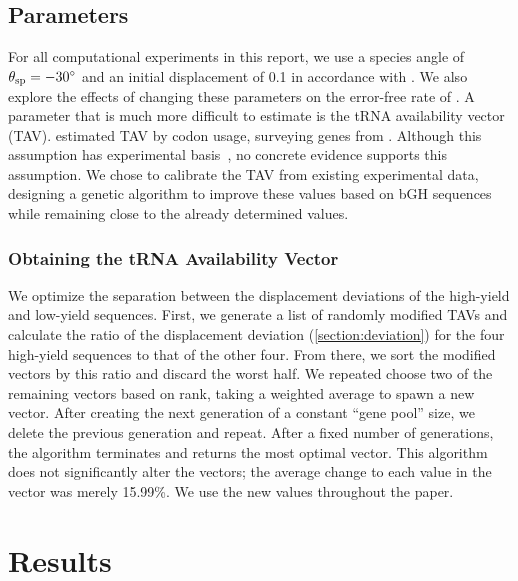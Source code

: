 \documentclass[twocolumn, article, oneside]{memoir}
\begin{document}
\subsection{Parameters}
\label{section:parameters}
For all computational experiments in this report, we use a species
angle of $\theta_{\textrm{sp}} = -30^\circ$ and an initial displacement of 0.1
in accordance with \citet{lalit:mechanics}.
We also explore the effects of changing these parameters on the
error-free rate of \prfB.
A parameter that is much more difficult to estimate
is the tRNA availability vector (TAV).
\citeauthor{lalit:mechanics} estimated TAV by codon usage,
surveying genes from \ecoli.
Although this assumption has experimental basis~\cite{ikemura},
no concrete evidence supports this assumption.
We chose to calibrate the TAV from existing experimental data,
designing a genetic algorithm to improve these values based on
bGH sequences while remaining close
to the already determined values.

\subsubsection{Obtaining the tRNA Availability Vector}
We optimize the separation between the displacement deviations of the
high-yield and low-yield sequences. First, we generate a list of
randomly modified TAVs and calculate the ratio of the
displacement deviation (\autoref{section:deviation}) for the four
high-yield sequences to that of the other four. From there, we sort the
modified vectors by this ratio and discard the worst half.
We repeated choose two of the remaining vectors based on rank, taking a weighted
average to spawn a new vector.  After creating the
next generation of a constant ``gene pool'' size, we delete
the previous generation and repeat. After a fixed number of
generations, the algorithm terminates and returns the most optimal vector.
This algorithm does not significantly alter the vectors; the average
change to each value in the vector was merely 15.99\%. We use the new values
throughout the paper.

\section{Results}
\subsection{\prfB}
\end{document}
